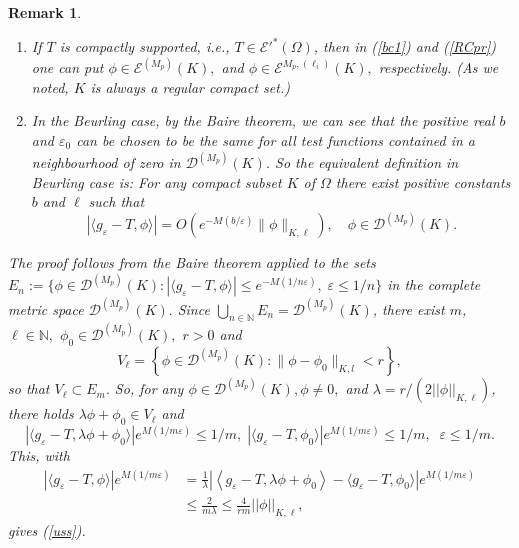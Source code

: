 \documentclass[sn-mathphys,Numbered]{sn-jnl}%
\theoremstyle{thmstyleone}%
\theoremstyle{thmstyletwo}%
\newtheorem{remark}{Remark}%
\theoremstyle{thmstylethree}%
\begin{document}
\begin{remark}\label{baire}
\begin{enumerate}
\item[(i)]
If  $T$ is compactly supported, i.e., $T\in\mathcal E'^*(\Omega)$,
then in (\ref{bc1}) and (\ref{RCpr}) one can put 
$\phi\in\mathcal E^{(M_p)}(K),$ and 
$\phi\in\mathcal E^{M_p,(\ell_i)}(K),$ respectively. (As we noted, $K$ is always a regular compact set.)
\item[(ii)]
In the Beurling  case,  by the Baire theorem, we can see that the positive real $b$ and $\varepsilon_0$ can be chosen to be the same for all test functions  contained in a neighbourhood of zero in  $\mathcal D^{(M_p)}(K)$. So the equivalent definition in Beurling case is: For any compact subset $K$ of $\Omega$ there exist positive constants $b $ and $\ell $ such that 
\begin{equation}\label{uss} 
|\langle g_{\varepsilon} -T, \phi\rangle| = O\left(e^{-M(b/\varepsilon)} \|\phi\|_{K,\ell}\right),\quad \phi\in\mathcal D^{(M_p)}(K).
\end{equation}
\end{enumerate}
The proof follows from the Baire theorem applied to the sets 
$E_n := \{\phi \in \mathcal D^{(M_p)}(K) : |\langle g_\varepsilon - T, \phi\rangle | \leq e^{ - M( 1 /n\varepsilon)}, \;\varepsilon \leq 1/n\}$ in the complete metric space $\mathcal D^{(M_p)}(K).$ Since $\bigcup_{n\in\mathbb{N}} E_n=\mathcal{D}^{(M_p)}(K)$, there exist $m$, $\ell\in\mathbb{N},$ $\phi_0\in\mathcal{D}^{(M_p)}(K),$ $r>0$ and 
\begin{equation*}
    V_\ell=\left\{\phi\in\mathcal{D}^{(M_p)}(K):\|\phi-\phi_0\|_{K,l}<r\right\},
\end{equation*}
so that $V_\ell\subset E_m.$ 
So, for any $\phi\in \mathcal D^{(M_p)}(K), \phi\neq 0,$  and $\lambda=r/(2||\phi||_{K,\ell})$, there holds
$\lambda\phi+\phi_0\in V_\ell$
and
\begin{equation*}
    |\langle g_\varepsilon-T,\lambda\phi+\phi_0 \rangle| e^{M(1/m\varepsilon)}\leq 1/m, \; |\langle g_\varepsilon-T,\phi_0 \rangle|e^{M(1/m\varepsilon)}\leq 1/m, \;\;\varepsilon\leq 1/m.
\end{equation*}
This, with 
\begin{align*}
|\langle g_\varepsilon-T,\phi \rangle|e^{M(1/m\varepsilon)}
&=\frac{1}{\lambda}|\left\langle g_\varepsilon-T,\lambda\phi+\phi_0 \right\rangle-
\langle g_\varepsilon-T,\phi_0 \rangle|e^{M(1/m\varepsilon)}\\
&\leq \frac{2}{m\lambda}\leq \frac{4}{rm}||\phi||_{K,\ell},
\end{align*}
gives (\ref{uss}).%
\end{remark}
\end{document}
